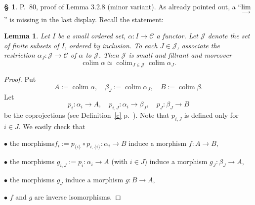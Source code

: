 \documentclass[12pt]{article}%
\newtheorem{lem}[thm]{Lemma}
\theoremstyle{remark}
\theoremstyle{definition}
\newtheorem{s}[thm]{\S}%
\newcommand{\bu}{\bullet}
\newcommand{\cc}{\mathcal}
\newcommand{\C}{\mathcal C}
\newcommand{\ilim}{\operatornamewithlimits{\underset{\longrightarrow}{lim}}}
\DeclareMathOperator*{\colim}{colim}
\begin{document}
\begin{s} 
P.~80, proof of Lemma 3.2.8 (minor variant). As already pointed out, a ``$\displaystyle\ilim$'' is missing in the last display. Recall the statement:
\begin{lem}
Let $I$ be a small ordered set, $\alpha:I\to\C$ a functor. Let $\cc J$ denote the set of finite subsets of $I$, ordered by inclusion. To each $J\in\cc J$, associate the restriction $\alpha_J:\cc J\to\C$ of $\alpha$ to $\cc J$. Then $\cc J$ is small and filtrant and moreover
$$
\colim\alpha\simeq\colim_{J\in\cc J}\colim\alpha_J.
$$
\end{lem}
\begin{proof}
Put
$$
A:=\colim\alpha,\quad
\beta_J:=\colim\alpha_J,\quad
B:=\colim\beta.
$$
Let 
$$
p_i:\alpha_i\to A,\quad 
p_{i,J}:\alpha_i\to\beta_J,\quad 
p_J:\beta_J\to B
$$
be the coprojections (see Definition~\ref{c} p.~\pageref{c}). Note that $p_{i,J}$ is defined only for $i\in J$. We easily check that 

\noindent$\bu$ the morphisms$f_i:=p_{\{i\}}\circ p_{i,\{i\}}:\alpha_i\to B$ induce a morphism $f:A\to B$, 

\noindent$\bu$ the morphisms $g_{i,J}:=p_i:\alpha_i\to A$ (with $i\in J$) induce a morphism $g_J:\beta_J\to A$, 

\noindent$\bu$ the morphisms $g_J$ induce a morphism $g:B\to A$, 

\noindent$\bu$ $f$ and $g$ are inverse isomorphisms.
\end{proof}
\end{s}

%
\end{document}
